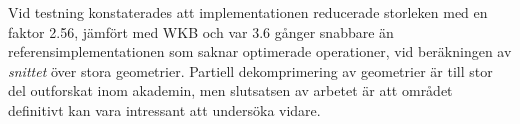 \documentclass{popsci}
\begin{document}
{Vid testning konstaterades att implementationen reducerade storleken med en faktor 2.56, jämfört med WKB och var 3.6 gånger snabbare än \mbox{referensimplementationen} som saknar optimerade operationer, vid beräkningen av \emph{snittet} över stora geometrier. Partiell dekomprimering av geometrier är till stor del outforskat inom akademin, men slutsatsen av arbetet är att området definitivt kan vara intressant att undersöka vidare.



}
\end{document}
